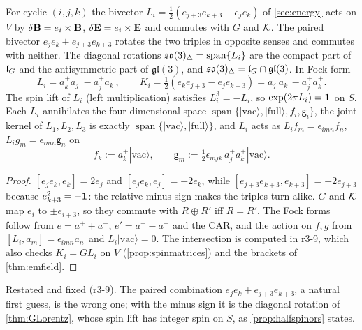 \begin{lemma}
\label{r3:lem:rot}
For cyclic $(i,j,k)$ the bivector $L_i=\tfrac12(e_{j+3}e_{k+3}-e_je_k)$ of \cref{sec:energy} acts on $V$ by $\delta\mathbf B=e_i\times\mathbf B$, $\delta\mathbf E=e_i\times\mathbf E$
and commutes with $G$ and $\mathcal K$. The paired bivector $e_je_k+e_{j+3}e_{k+3}$ rotates the two triples in opposite senses and commutes with
neither. The diagonal rotations $\mathfrak{so}(3)_\Delta=\operatorname{span}\{L_i\}$ are the compact part of $\mathfrak l_G$ and the antisymmetric part of
$\mathfrak{gl}(3)$, and $\mathfrak{so}(3)_\Delta=\mathfrak l_G\cap\mathfrak{gl}(3)$. In Fock form
\[
L_i=a^+_ka^-_j-a^+_ja^-_k,\qquad K_i=\tfrac12(e_ke_{j+3}-e_je_{k+3})=a^-_ja^-_k-a^+_ja^+_k .
\]
The spin lift of $L_i$ (left multiplication) satisfies $L_i^3=-L_i$, so $\exp(2\pi L_i)=\mathbf 1$ on $S$. Each $L_i$ annihilates the
four-dimensional space $\operatorname{span}\{|\mathrm{vac}\rangle,|\mathrm{full}\rangle,f_i,\mathsf g_i\}$, the joint kernel of $L_1,L_2,L_3$ is
exactly $\operatorname{span}\{|\mathrm{vac}\rangle,|\mathrm{full}\rangle\}$, and $L_i$ acts as $L_if_m=\epsilon_{imn}f_n$, $L_ig_m=\epsilon_{imn}\mathsf g_n$ on
\[
f_k:=a^+_k|\mathrm{vac}\rangle,\qquad \mathsf g_m:=\tfrac12\epsilon_{mjk}\,a^+_ja^+_k|\mathrm{vac}\rangle .
\]
\end{lemma}

\begin{proof}
$[e_je_k,e_k]=2e_j$ and $[e_je_k,e_j]=-2e_k$, while $[e_{j+3}e_{k+3},e_{k+3}]=-2e_{j+3}$ because $e_{k+3}^2=-\mathbf 1$: the relative minus sign makes the
triples turn alike. $G$ and $\mathcal K$ map $e_i$ to $\pm e_{i+3}$, so they commute with $R\oplus R'$ iff $R=R'$. The Fock forms follow from
$e=a^++a^-$, $e'=a^+-a^-$ and the CAR, and the action on $f,g$ from $[L_i,a^+_m]=\epsilon_{imn}a^+_n$ and $L_i|\mathrm{vac}\rangle=0$. The intersection is
computed in r3-9, which also checks $K_i=GL_i$ on $V$ (\cref{prop:spinmatrices}) and the brackets of \cref{thm:emfield}.
\end{proof}

Restated and fixed (r3-9). The paired combination $e_je_k+e_{j+3}e_{k+3}$, a natural first guess, is the wrong one; with the minus sign it is the diagonal
rotation of \cref{thm:GLorentz}, whose spin lift has integer spin on $S$, as \cref{prop:halfspinors} states.

